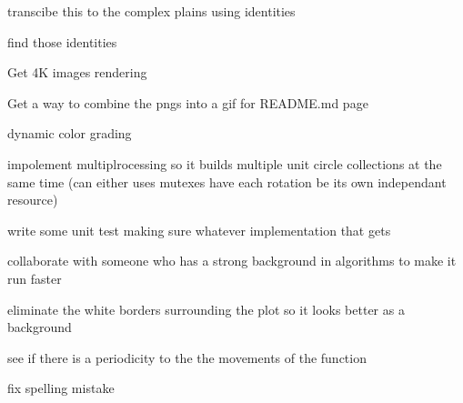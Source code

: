 
\begin{DoxyRefList}
\item[Class \mbox{\hyperlink{classEulersSpiral_1_1EulersSpiral}{Eulers\+Spiral.Eulers\+Spiral}} ]\label{todo__todo000001}%
%
transcibe this to the complex plains using identities 

find those identities  
\item[Namespace \mbox{\hyperlink{namespaceJulia}{Julia}} ]\label{todo__todo000002}%
%
Get 4K images rendering 

Get a way to combine the pngs into a gif for README.\+md page 

dynamic color grading 

impolement multiplrocessing so it builds multiple unit circle collections at the same time (can either uses mutexes have each rotation be its own independant resource) 

write some unit test making sure whatever implementation that gets 

collaborate with someone who has a strong background in algorithms to make it run faster 

eliminate the white borders surrounding the plot so it looks better as a background 

see if there is a periodicity to the the movements of the function  
\item[Member \mbox{\hyperlink{classJulia_1_1Julia_a966f5090e8ab789ab45b8bbe84435da9}{Julia.Julia.color\+\_\+map\+\_\+\+PIL}} (self, itterations\+\_\+til\+\_\+divergence)]\label{todo__todo000003}%
%
fix spelling mistake 
\end{DoxyRefList}